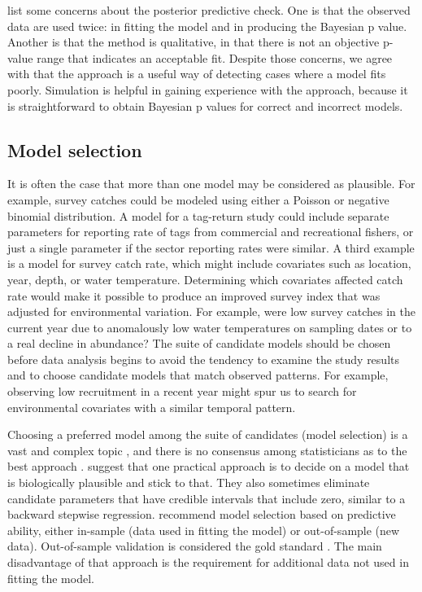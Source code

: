 \documentclass[
]{krantz}
\begin{document}
\citet{kéry.schaub_2011} list some concerns about the posterior predictive check. One is that the observed data are used twice: in fitting the model and in producing the Bayesian p value. Another is that the method is qualitative, in that there is not an objective p-value range that indicates an acceptable fit. Despite those concerns, we agree with \citet{kéry.schaub_2011} that the approach is a useful way of detecting cases where a model fits poorly. Simulation is helpful in gaining experience with the approach, because it is straightforward to obtain Bayesian p values for correct and incorrect models.

\hypertarget{Model-selection}{%
\subsection{Model selection}\label{Model-selection}}

It is often the case that more than one model may be considered as plausible. For example, survey catches could be modeled using either a Poisson or negative binomial distribution. A model for a tag-return study could include separate parameters for reporting rate of tags from commercial and recreational fishers, or just a single parameter if the sector reporting rates were similar. A third example is a model for survey catch rate, which might include covariates such as location, year, depth, or water temperature. Determining which covariates affected catch rate would make it possible to produce an improved survey index that was adjusted for environmental variation. For example, were low survey catches in the current year due to anomalously low water temperatures on sampling dates or to a real decline in abundance? The suite of candidate models should be chosen before data analysis begins \citep{burnham.anderson_2004} to avoid the tendency to examine the study results and to choose candidate models that match observed patterns. For example, observing low recruitment in a recent year might spur us to search for environmental covariates with a similar temporal pattern.

Choosing a preferred model among the suite of candidates (model selection) is a vast and complex topic \citep{link.barker_2010}, and there is no consensus among statisticians as to the best approach \citep{kéry.schaub_2011}. \citet{kéry.schaub_2011} suggest that one practical approach is to decide on a model that is biologically plausible and stick to that. They also sometimes eliminate candidate parameters that have credible intervals that include zero, similar to a backward stepwise regression. \citet{hooten.hobbs2015} recommend model selection based on predictive ability, either in-sample (data used in fitting the model) or out-of-sample (new data). Out-of-sample validation is considered the gold standard \citep{hooten.hobbs2015}. The main disadvantage of that approach is the requirement for additional data not used in fitting the model.
\end{document}
